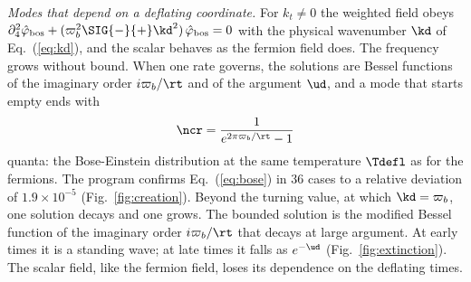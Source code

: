 \emph{Modes that depend on a deflating coordinate.} For $k_t\ne0$ the weighted field obeys
$\partial_4^{2}\hat\varphi_{\mathrm{bos}}+(\varpi_b^{2}\SIG{-}{+}\kd^{2})\,\hat\varphi_{\mathrm{bos}}=0$
with the physical wavenumber $\kd$ of Eq.~(\ref{eq:kd}), and the scalar behaves as the fermion field
does.
The frequency grows without bound. When one rate governs, the solutions are Bessel functions of the
imaginary order $i\varpi_b/\rt$ and of the argument $\ud$, and a mode that starts empty ends with
\begin{equation}
\ncr=\frac{1}{e^{2\pi\varpi_b/\rt}-1}
\label{eq:bose}
\end{equation}
quanta: the Bose-Einstein distribution at the same temperature $\Tdefl$ as for the fermions. The
program confirms Eq.~(\ref{eq:bose}) in 36 cases to a relative deviation of $1.9\times10^{-5}$
(Fig.~\ref{fig:creation}).
Beyond the turning value, at which $\kd=\varpi_b$, one solution decays and one grows. The bounded
solution is the modified Bessel function of the imaginary order $i\varpi_b/\rt$ that decays at large
argument. At early times it is a standing wave; at late times it falls as $e^{-\ud}$
(Fig.~\ref{fig:extinction}). The scalar field, like the fermion field, loses its dependence on the
deflating times.

